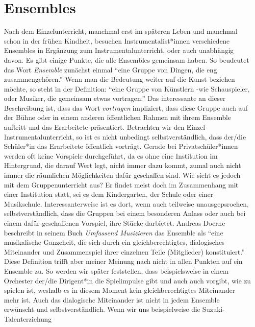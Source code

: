 \section{Ensembles}

Nach dem Einzelunterricht, manchmal erst im späteren Leben und manchmal schon in
der frühen Kindheit, besuchen Instrumentalist*innen verschiedene Ensembles in
Ergänzung zum Instrumentalunterricht, oder auch unabhängig davon. Es gibt einige
Punkte, die alle Ensembles gemeinsam haben. So beudeutet das Wort
\emph{Ensemble} zunächst einmal \enquote{eine Gruppe von Dingen, die eng
zusammengehören.}\autocite{wikipedia:gruppe} Wenn man die Bedeutung weiter auf
die Kunst beziehen möchte, so steht in der Definition: \enquote{eine Gruppe von
Künstlern -wie Schauspieler, oder Musiker, die gemeinsam etwas vortragen.}
\autocite{wikipedia:gruppe} Das interessante an dieser Beschreibung ist, dass
das Wort \emph{vortragen} impliziert, dass diese Gruppe auch auf der Bühne oder
in einem anderen öffentlichen Rahmen mit ihrem Ensemble auftritt und das
Erarbeitete präsentiert. Betrachten wir den Einzel- Instrumentalunterricht, so
ist es nicht unbedingt selbstverständlich, dass der/die Schüler*in das
Erarbeitete öffentlich vorträgt. Gerade bei Privatschüler*innen werden oft keine
Vorspiele durchgeführt, da es ohne eine Institution im Hintergrund, die darauf
Wert legt, nicht immer dazu kommt, zumal auch nicht immer die räumlichen
Möglichkeiten dafür geschaffen sind. Wie sieht es jedoch mit dem
Gruppenunterricht aus? Er findet meist doch im Zusammenhang mit einer
Institution statt, sei es dem Kindergarten, der Schule oder einer Musikschule.
Interessanterweise ist es dort, wenn auch teilweise unausgepsrochen,
selbstverständlich, dass die Gruppen bei einem besonderen Anlass oder auch bei
einem dafür geschaffenen Vorspiel, ihre Stücke darbietet. Andreas Doerne
beschreibt in seinem Buch \emph{Umfassend Musizieren} das Ensemble als
\enquote{eine musikalische Ganzeheit, die sich durch ein gleichberechtigtes,
dialogisches Miteinander und Zusammenspiel ihrer einzelnen Teile (Mitglieder)
konstituiert.} \autocite[62]{doerne:umfassend_musizieren} Diese Definition
trifft aber meiner Meinung nach nicht in allen Punkten auf ein Ensemble zu. So
werden wir später feststellen, dass beispielsweise in einem Orchester der/die
Dirigent*in die Spielimpulse gibt und auch auch vorgibt, wie zu spielen ist,
weshalb es in diesem Moment kein gleichberechtigtes Miteinander mehr ist. Auch
das dialogische Miteinander ist nicht in jedem Ensemble erwünscht und
selbstverständlich. Wenn wir uns beispielweise die Suzuki-Talenterziehung
